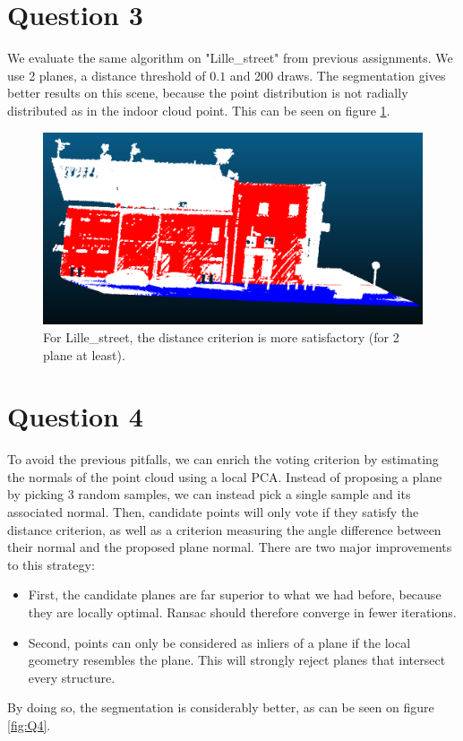 \documentclass[a4paper]{article}
\begin{document}
\section*{Question 3}

We evaluate the same algorithm on "Lille\_street" from previous assignments.
We use 2 planes, a distance threshold of $0.1$ and 200 draws.
The segmentation gives better results on this scene, because the point distribution is not radially distributed as in the indoor cloud point. This can be seen on figure \ref{fig:Q3}.

\begin{figure}[ht]
    \centering
    \includegraphics[width=0.3\linewidth]{figures/Q3.png}
    \caption{For Lille\_street, the distance criterion is more satisfactory (for 2 plane at least).}
    \label{fig:Q3}
\end{figure}

\section*{Question 4}

To avoid the previous pitfalls, we can enrich the voting criterion by estimating the normals of the point cloud using a local PCA. Instead of proposing
a plane by picking 3 random samples, we can instead pick a single sample and its associated normal. Then, candidate points will only vote if they satisfy the distance criterion, as well
as a criterion measuring the angle difference between their normal and the proposed plane normal.
There are two major improvements to this strategy:
\begin{itemize}
    \item First, the candidate planes are far superior to what we had before, because they are locally optimal. Ransac should therefore converge in fewer iterations.
    \item Second, points can only be considered as inliers of a plane if the local geometry resembles the plane. This will strongly reject planes that intersect every structure.
\end{itemize}


By doing so, the segmentation is considerably better, as can be seen on figure \ref{fig:Q4}.
\end{document}
